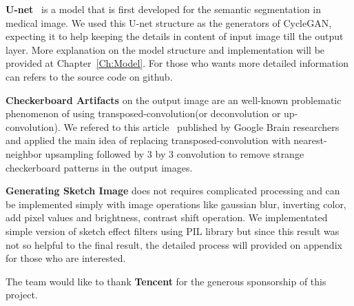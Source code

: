 \textbf{U-net}~\cite{unet} is a model that is first developed for the semantic segmentation in medical image. We used this U-net structure as the generators of CycleGAN, expecting it to help keeping the details in content of input image till the output layer. More explanation on the model structure and implementation will be provided at Chapter~\ref{Ch:Model}. For those who wants more detailed information can refers to the source code on github.

\textbf{Checkerboard Artifacts} on the output image are an well-known problematic phenomenon of using transposed-convolution(or deconvolution or up-convolution). We refered to this article~\cite{odena2016deconvolution} published by Google Brain researchers and applied the main idea of replacing transposed-convolution with nearest-neighbor upsampling followed by 3 by 3 convolution to remove strange checkerboard patterns in the output images.

\textbf{Generating Sketch Image} does not requires complicated processing and can be implemented simply with image operations like gaussian blur, inverting color, add pixel values and brightness, contrast shift operation. We implementated simple version of sketch effect filters using PIL library but since this result was not so helpful to the final result, the detailed process will provided on appendix for those who are interested.

The team would like to thank \textbf{Tencent} for the generous sponsorship of this project.

\endinput




